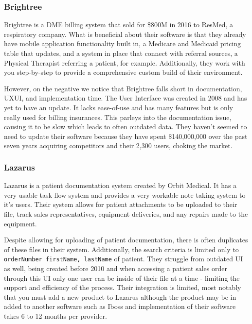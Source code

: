 \documentclass[12pt]{article}
\begin{document}
    \subsubsection{Brightree}
    Brightree is a DME billing system that sold for \$800M in 2016 to ResMed, a respiratory company. What is beneficial about their software is that they already have mobile application functionality built in, a Medicare and Medicaid pricing table that updates, and a system in place that connect with referral sources, a Physical Therapist referring a patient, for example. Additionally, they work with you step-by-step to provide a comprehensive custom build of their environment.

    However, on the negative we notice that Brightree falls short in documentation, UXUI, and implementation time. The User Interface was created in 2008 and has yet to have an update. It lacks ease-of-use and has many features but is only really used for billing insurances. This parleys into the documentation issue, causing it to be slow which leads to often outdated data. They haven’t seemed to need to update their software because they have spent \$140,000,000 over the past seven years acquiring competitors and their 2,300 users, choking the market.

    \subsubsection{Lazarus}
    Lazarus is a patient documentation system created by Orbit Medical. It has a very usable task flow system and provides a very workable note-taking system to it’s users. Their system allows for patient attachments to be uploaded to their file, track sales representatives, equipment deliveries, and any repairs made to the equipment.

    Despite allowing for uploading of patient documentation, there is often duplicates of these files in their system. Additionally, the search criteria is limited only to \texttt{orderNumber firstName, lastName} of patient. They struggle from outdated UI as well, being created before 2010 and when accessing a patient sales order through this UI only one user can be inside of their file at a time - limiting the support and efficiency of the process. Their integration is limited, most notably that you must add a new product to Lazarus although the product may be in added to another software such as Iboss and implementation of their software takes 6 to 12 months per provider.
\end{document}

